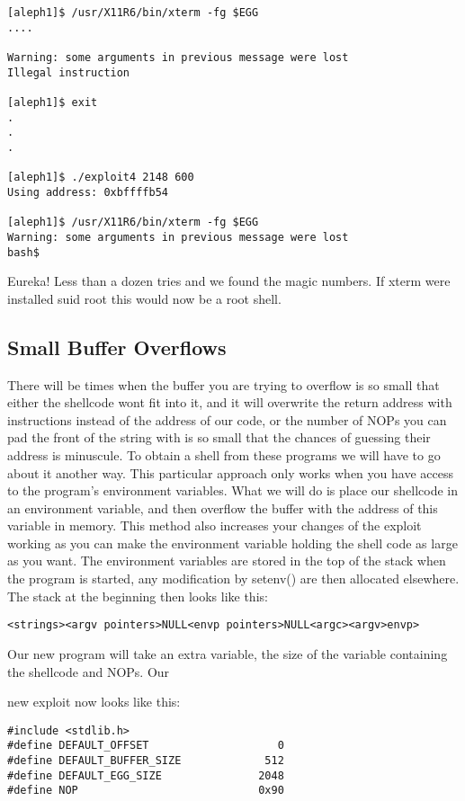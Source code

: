 \documentclass[10pt]{article}
\begin{document}
\begin{CJK}{UTF8}{bsmi}
\begin{verbatim}
[aleph1]$ /usr/X11R6/bin/xterm -fg $EGG
....

Warning: some arguments in previous message were lost
Illegal instruction

[aleph1]$ exit
.
.
.

[aleph1]$ ./exploit4 2148 600
Using address: 0xbffffb54

[aleph1]$ /usr/X11R6/bin/xterm -fg $EGG
Warning: some arguments in previous message were lost
bash$
\end{verbatim}


Eureka! Less than a dozen tries and we found the magic numbers. If xterm were installed suid root this would 
now be a root shell. 

\subsection{Small Buffer Overflows}
There will be times when  the buffer you are trying to overflow is so small that either the shellcode wont fit into 
it, and it will overwrite the return address with instructions instead of the address of our code, or the number of 
NOPs you can pad the front of the string with is so small that the chances of guessing their address is 
minuscule. To obtain a shell from these programs we will have to go about it another way. This particular 
approach only works when you have access to the program's environment variables. What we will do is place 
our shellcode in an environment variable, and then overflow the buffer with the address of this variable in 
memory. This method also increases your changes of the exploit working as you can make the environment 
variable holding the shell code as large as you want. The environment variables are stored in the top of the stack 
when the program is started, any modification by setenv() are then allocated elsewhere. The stack at the 
beginning then looks like this:

\begin{verbatim}
<strings><argv pointers>NULL<envp pointers>NULL<argc><argv>envp> 
\end{verbatim}

Our new program will take an extra variable, the size of the variable containing the shellcode and NOPs. Our 

new exploit now looks like this:

\begin{lstlisting}[caption=exploit4.c]
#include <stdlib.h>
#define DEFAULT_OFFSET                    0
#define DEFAULT_BUFFER_SIZE             512
#define DEFAULT_EGG_SIZE               2048
#define NOP                            0x90


\end{lstlisting}
\end{CJK}
\end{document}
